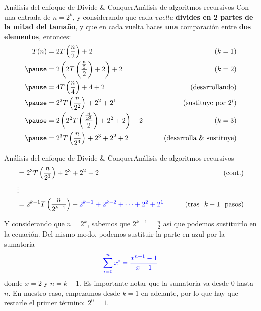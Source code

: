 \documentclass[spanish, c]{beamer}
\begin{document}
\begin{frame}{Análisis del enfoque de Divide \& Conquer}{Análisis de algoritmos recursivos}
    Con una entrada de $n = 2^k$, y considerando que cada \textit{vuelta} \textbf{divides en 2 partes de la mitad del tamaño}, y que en cada vuelta haces \textbf{una} comparación entre \textbf{dos elementos}, entonces: \pause
    \begin{align*}
        T(n) & = 2T\left(\frac{n}{2}\right) + 2  & \tag{$k = 1$}\\ \pause
             & = 2\left(2T\left(\frac{\frac{n}{2}}{2}\right) + 2\right) + 2  & \tag{$k = 2$}\\ \pause
             & = 4T\left(\frac{n}{4}\right) + 4 + 2 & \tag{\text{desarrollando}} \\ \pause
             & = 2^2 T\left(\frac{n}{2^2}\right) + 2^2 + 2^1 & \tag{\text{sustituye por }$2^i$} \\ \pause
             & = 2\left(2^2 T\left(\frac{\frac{n}{2^2}}{2}\right) + 2^2  + 2 \right) + 2 & \tag{$k = 3$} \\ \pause
             & = 2^3 T\left(\frac{n}{2^3}\right) + 2^3 + 2^2 + 2 & \tag{\text{desarrolla \& sustituye}} %
    \end{align*}
\end{frame}

\begin{frame}{Análisis del enfoque de Divide \& Conquer}{Análisis de algoritmos recursivos}
    \begin{align*}
        & = 2^3 T\left(\frac{n}{2^3}\right) + 2^3 + 2^2 + 2 & \tag{\text{cont.}} \\ 
        & \vdots \\
        & = 2^{k-1} T\left(\frac{n}{2^{k-1}}\right) + {\color{blue} 2^{k-1} + 2^{k-2} + \dots + 2^2 + 2^1} & \tag{\text{tras } $k-1$ \text{ pasos}}
    \end{align*}

    Y considerando que $n = 2^k$, sabemos que $2^{k-1} = \frac{n}{2}$ así que podemos sustituirlo en la ecuación.    
    Del mismo modo, podemos sustituir la parte en {\color{blue} azul} por la sumatoria
    $$\color{blue} \sum\limits_{i=0}^n x^i = \frac{x^{n+1} - 1}{x - 1}$$
    donde $x = 2$ y $n = k-1$. Es importante notar que la sumatoria va desde $0$ hasta $n$. 
    En nuestro caso, empezamos desde $k=1$ en adelante, por lo que hay que restarle el primer término: $2^0 = 1$.
\end{frame}
\end{document}
